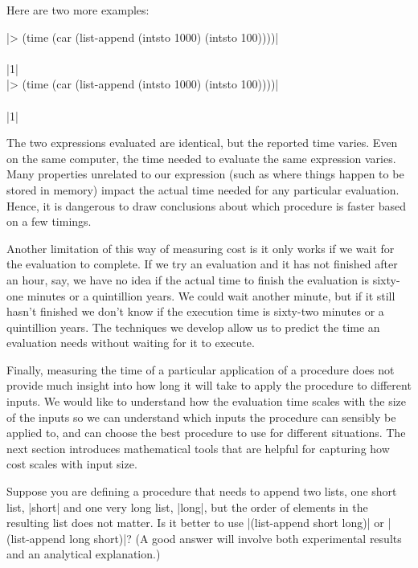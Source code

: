 \begin{schemeregion}
Here are two more examples:
\begin{code}
\scheme|> (time (car (list-append (intsto 1000) (intsto 100))))|\\
\\
\schemeresult|1|\\
\scheme|> (time (car (list-append (intsto 1000) (intsto 100))))|\\
\\
\schemeresult|1|
\end{code}

The two expressions evaluated are identical, but the reported time varies.  Even on the same computer, the time needed to evaluate the same expression varies.  Many properties unrelated to our expression (such as where things happen to be stored in memory) impact the actual time needed for any particular evaluation.  Hence, it is dangerous to draw conclusions about which procedure is faster based on a few timings.  

Another limitation of this way of measuring cost is it only works if we wait for the evaluation to complete.  If we try an evaluation and it has not finished after an hour, say, we have no idea if the actual time to finish the evaluation is sixty-one minutes or a quintillion years.  We could wait another minute, but if it still hasn't finished we don't know if the execution time is sixty-two minutes or a quintillion years.  The techniques we develop allow us to predict the time an evaluation needs without waiting for it to execute.

Finally, measuring the time of a particular application of a procedure does not provide much insight into how long it will take to apply the procedure to different inputs.  We would like to understand how the evaluation time scales with the size of the inputs so we can understand which inputs the procedure can sensibly be applied to, and can choose the best procedure to use for different situations.  The next section introduces mathematical tools that are helpful for capturing how cost scales with input size.

\beforesplitex
\begin{exercise}
Suppose you are defining a procedure that needs to append two lists, one short list, \scheme|short| and one very long list, \scheme|long|, but the order of elements in the resulting list does not matter.  Is it better to use \scheme|(list-append short long)| or \scheme|(list-append long short)|? (A good answer will involve both experimental results and an analytical explanation.)
\solution{\LATER{}}
\end{exercise}
\aftersplitex


\end{schemeregion}
